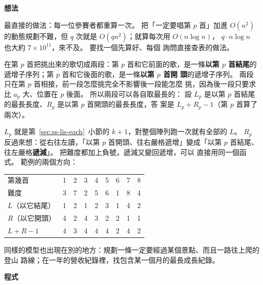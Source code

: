 \textbf{想法}

最直接的做法：每一位參賽者都重算一次。 把「一定要唱第 $p$ 首」加進
$O(n^2)$ 的動態規劃不難，但 $q$ 次就是 $O(qn^2)$；就算每次用 $O(n \log n)$，
$q \cdot n \log n$ 也大約 $7 \times 10^{11}$，來不及。 要找一個先算好、每個
詢問直接查表的做法。

在第 $p$ 首把挑出來的歌切成兩段：第 $p$ 首和它前面的歌，是一條\textbf{以第
$p$ 首結尾}的遞增子序列；第 $p$ 首和它後面的歌，是一條\textbf{以第 $p$ 首開
頭}的遞增子序列。 兩段只在第 $p$ 首相接，前一段怎麼挑完全不影響後一段能怎麼
挑，因為後一段只要求比 $a_p$ 大、位置在 $p$ 後面。 所以兩段可以各自取最長的：
設 $L_p$ 是以第 $p$ 首結尾的最長長度、$R_p$ 是以第 $p$ 首開頭的最長長度，答
案是 $L_p + R_p - 1$（第 $p$ 首算了兩次）。

$L_p$ 就是第~\ref{sec:ss-lis-each}~小節的 $k + 1$，對整個陣列跑一次就有全部的
$L$。 $R_p$ 反過來想：從右往左讀，「以第 $p$ 首開頭、往右嚴格遞增」變成「以第
$p$ 首結尾、往左嚴格\textbf{遞減}」。 把難度都加上負號，遞減又變回遞增，可以
直接用同一個函式。 範例的兩個方向：

\begin{center}
\begin{tabular}{l*{8}{c}}
\toprule
第幾首 & 1 & 2 & 3 & 4 & 5 & 6 & 7 & 8 \\
難度 & 3 & 7 & 2 & 5 & 6 & 1 & 8 & 4 \\
\midrule
$L$（以它結尾） & 1 & 2 & 1 & 2 & 3 & 1 & 4 & 2 \\
$R$（以它開頭） & 4 & 2 & 4 & 3 & 2 & 2 & 1 & 1 \\
$L + R - 1$ & 4 & 3 & 4 & 4 & 4 & 2 & 4 & 2 \\
\bottomrule
\end{tabular}
\end{center}

同樣的模型也出現在別的地方：規劃一條一定要經過某個景點、而且一路往上爬的登山
路線；在一年的營收紀錄裡，找包含某一個月的最長成長紀錄。

\textbf{程式}

